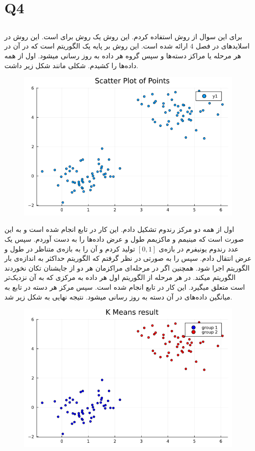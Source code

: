 \documentclass[a4paper]{article}
\begin{document}
\section{Q4}
\subsection{}
برای این سوال از روش 
استفاده کردم. این روش یک روش برای 
است. این روش در اسلایدهای 
در فصل $ 4 $ ارائه شده است. این روش بر پایه یک الگوریتم 
است که در آن در هر مرحله 
یا مراکز دسته‌ها و سپس 
گروه هر داده به روز رسانی میشود. اول از همه داده‌ها را کشیدم. شکلی مانند شکل زیر داشت. 
\begin{figure}[H]
	\centering
	\includegraphics[width=0.75 \linewidth]{DataScattet}
	\caption{
	}
\end{figure}

اول از همه دو مرکز رندوم تشکیل دادم. این کار در تابع 
انجام شده است و به این صورت است که مینیمم و ماکزیمم طول و عرض داده‌ها را به دست آوردم. سپس یک عدد رندوم یونیفرم در بازه‌ی 
$ [0,1] $
تولید کردم و آن را به بازه‌ی متناظر در طول و عرض انتقال دادم. سپس 
 را به صورتی در نظر گرفتم که الگوریتم حداکثر به اندازه‌ی 
 بار الگوریتم اجرا شود. همچنین اگر در مرحله‌ای مراکزمان  هر دو از جایشنان تکان نخوردند الگوریتم 
 میکند. در هر مرحله از الگوریتم اول هر داده به مرکزی که به آن نزدیک‌تر است متعلق میگیرد. این کار در تابع
 انجام شده است. سپس مرکز هر دسته در تابع 
 به میانگین داده‌های در آن دسته به روز رسانی میشود. نتیجه نهایی به شکل زیر شد. 
\begin{figure}[H]
	\centering
	\includegraphics[width=0.75 \linewidth]{res1}
	\caption{
	}
\end{figure}
\end{document}
